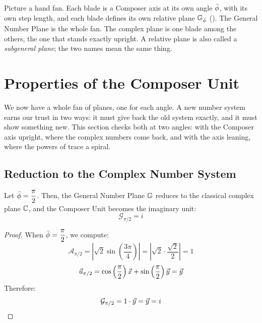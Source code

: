 \begin{plainwords}
Picture a hand fan. Each blade is a Composer axis at its own angle $\bar{\phi}$, with its own step length, and each blade defines its own relative plane $\mathbb{G}_{\bar{\phi}}$ (). The General Number Plane is the whole fan. The complex plane is one blade among the others, the one that stands exactly upright. A relative plane is also called a \emph{subgeneral plane}; the two names mean the same thing.
\end{plainwords}

\section{Properties of the Composer Unit}\label{sec:composer-properties}

We now have a whole fan of planes, one for each angle. A new number system earns our trust in two ways: it must give back the old system exactly, and it must show something new. This section checks both at two angles: with the Composer axis upright, where the complex numbers come back, and with the axis leaning, where the powers of  trace a spiral.

\subsection[Reduction to the Complex Numbers]{Reduction to the Complex Number System}\label{subsec:reduction}

\begin{theorem}\label{thm:classical-recovery}
Let $\bar{\phi} = \dfrac{\pi}{2}$. Then, the General Number Plane $\mathbb{G}$ reduces to the classical complex plane $\mathbb{C}$, and the Composer Unit becomes the imaginary unit:
\[
\mathcal{G}_{\pi/2} = i
\]
\end{theorem}

\begin{proof}
When $\bar{\phi} = \dfrac{\pi}{2}$, we compute:
\[
\mathcal{A}_{\pi/2} = \left|\sqrt{2}\sin\left(\frac{3\pi}{4}\right)\right| = \left|\sqrt{2} \cdot \frac{\sqrt{2}}{2}\right| = 1
\]
\[
\vec{u}_{\pi/2} = \cos\left(\frac{\pi}{2}\right)\vec{x} + \sin\left(\frac{\pi}{2}\right)\vec{y} = \vec{y}
\]
Therefore:
\[
\mathcal{G}_{\pi/2} = 1 \cdot \vec{y} = \vec{y} = i
\]
\end{proof}

